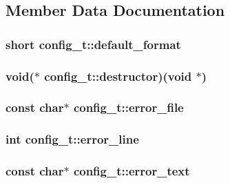 \subsection{Member Data Documentation}
\hypertarget{structconfig__t_aef80ce4b7772667e6615a19633ce0a65}{
\subsubsection[{default\_\-format}]{\setlength{\rightskip}{0pt plus 5cm}short {\bf config\_\-t::default\_\-format}}}
\label{structconfig__t_aef80ce4b7772667e6615a19633ce0a65}
\hypertarget{structconfig__t_a2d05a50f18015afcd6b4b2a1a97e678c}{
\subsubsection[{destructor}]{\setlength{\rightskip}{0pt plus 5cm}void($\ast$ {\bf config\_\-t::destructor})(void $\ast$)}}
\label{structconfig__t_a2d05a50f18015afcd6b4b2a1a97e678c}
\hypertarget{structconfig__t_a244b41324f8458377c6aff4c5caa966f}{
\subsubsection[{error\_\-file}]{\setlength{\rightskip}{0pt plus 5cm}const char$\ast$ {\bf config\_\-t::error\_\-file}}}
\label{structconfig__t_a244b41324f8458377c6aff4c5caa966f}
\hypertarget{structconfig__t_a4c437bd0d5063aaf27f68cb84bba8616}{
\subsubsection[{error\_\-line}]{\setlength{\rightskip}{0pt plus 5cm}int {\bf config\_\-t::error\_\-line}}}
\label{structconfig__t_a4c437bd0d5063aaf27f68cb84bba8616}
\hypertarget{structconfig__t_ab1af593275e4d341c8cc455a9e84588d}{
\subsubsection[{error\_\-text}]{\setlength{\rightskip}{0pt plus 5cm}const char$\ast$ {\bf config\_\-t::error\_\-text}}}
